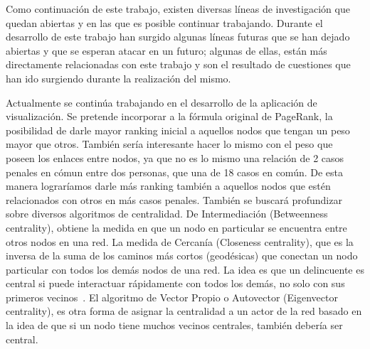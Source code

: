 Como continuación de este trabajo, existen diversas líneas de investigación que quedan abiertas y en las que es posible continuar trabajando. Durante el desarrollo de este trabajo han surgido algunas líneas futuras que se han dejado abiertas y que se esperan atacar en un futuro; algunas de ellas, están más directamente relacionadas con este trabajo y son el resultado de cuestiones que han ido surgiendo durante la realización del mismo.

Actualmente se 	continúa trabajando en el desarrollo de la aplicación de visualización. Se pretende incorporar a la fórmula original de PageRank, la posibilidad de darle mayor ranking inicial a aquellos nodos que tengan un peso mayor que otros. También sería interesante hacer lo mismo con el peso que poseen los enlaces entre nodos, ya que no es lo mismo una relación de 2 casos penales en cómun entre dos personas, que una de 18 casos en común. De esta manera lograríamos darle más ranking también a aquellos nodos que estén relacionados con otros en más casos penales. También se buscará profundizar sobre diversos algoritmos de centralidad. De Intermediación (Betweenness centrality), obtiene la medida en que un nodo en particular se encuentra entre otros nodos en una red. La medida  de Cercanía (Closeness centrality), que es la inversa de la suma de los caminos más cortos (geodésicas) que conectan un nodo particular con todos los demás nodos de una red. La idea es que un delincuente es central si puede interactuar rápidamente con todos los demás, no solo con sus primeros vecinos~\cite{newman2005measure}. El algoritmo  de Vector Propio o Autovector (Eigenvector centrality), es otra forma de asignar la centralidad a un actor de la red basado en la idea de que si un nodo tiene muchos vecinos centrales, también debería ser central.
 